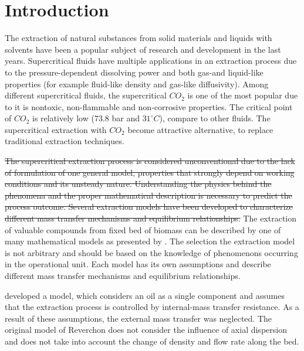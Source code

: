 \documentclass[a4paper,fleqn]{cas-dc}
\begin{document}

\section{Introduction}
The extraction of natural substances from solid materials and liquids with solvents have been a popular subject of research and development in the last years. Supercritical fluids have multiple applications in an extraction process due to the pressure-dependent dissolving power and {\color{blue} both gas-and liquid-like properties (for example fluid-like density and gas-like diffusivity). Among different supercritical fluids, the supercritical $CO_2$ is one of the most popular due to it is nontoxic, non-flammable and non-corrosive properties. The critical point of $CO_2$ is relatively low ($73.8$ bar and $31 ^\circ C$), compare to other fluids. The supercritical extraction with $CO_2$ become attractive alternative, to replace traditional extraction techniques.}

\sout{The supercritical extraction process is considered unconventional due to the lack of formulation of one general model, properties that strongly depend on working conditions and its unsteady nature. Understanding the physics behind the phenomena and the proper mathematical description is necessary to predict the process outcome. Several extraction models have been developed to characterize different mass transfer mechanisms and equilibrium relationships.}
{\color{blue}The extraction of valuable compounds from fixed bed of biomass can be described by one of many mathematical models as presented by \citet{Huang2012}. The selection the extraction model is not arbitrary and should be based on the knowledge of phenomenons occurring in the operational unit. Each model has its own assumptions and describe different mass transfer mechanisms and equilibrium relationships}. 

\citet{Reverchon1996} developed a model, which considers an oil as a single component and assumes that the extraction process is controlled by internal-mass transfer resistance. As a result of these assumptions, the external mass transfer was neglected. The original model of Reverchon does not consider the influence of axial dispersion and does not take into account the change of density and flow rate along the bed. 
\end{document}

